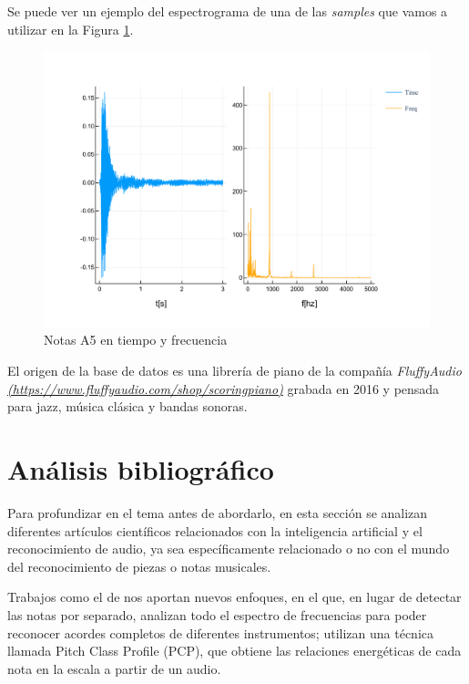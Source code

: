 \documentclass[12pt]{article}
\begin{document}
Se puede ver un ejemplo del espectrograma de una de las \textit{samples} que vamos a utilizar en la Figura 
\ref{fig:espectro}.

\begin{figure}[!ht]
	\centering
	\includegraphics[width=1.0\linewidth]{assets/A5.pdf}
	\caption{Notas A5 en tiempo y frecuencia}
	\label{fig:espectro}
\end{figure}

\bigskip
El origen de la base de datos es una librería de piano de la compañía \textit{FluffyAudio} \textit{\url{(https://www.fluffyaudio.com/shop/scoringpiano)}} 
grabada en 2016 y pensada para jazz, música clásica y bandas sonoras.

\section{Análisis bibliográfico}
\label{Análisis bibliográfico}
Para profundizar en el tema antes de abordarlo, en esta sección se analizan diferentes artículos científicos relacionados con la inteligencia
artificial y el reconocimiento de audio, ya sea específicamente relacionado o no con el mundo del reconocimiento de piezas o notas musicales.

\bigskip
Trabajos como el de \cite{osmalsky2012neural} nos aportan nuevos enfoques, 
en el que, en lugar de detectar las notas por separado, analizan todo el espectro de frecuencias para poder reconocer acordes completos de diferentes instrumentos;
utilizan una técnica llamada Pitch Class Profile (PCP), que obtiene las relaciones energéticas de cada nota en la escala a partir de un audio.
\end{document}
